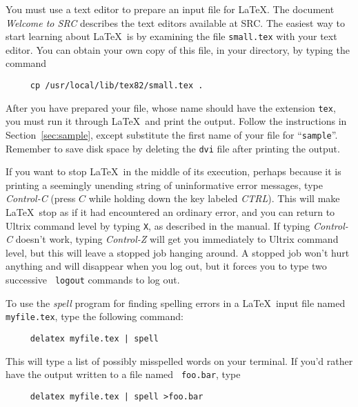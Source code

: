 You must use a text editor to prepare an input file for \LaTeX. The
document {\em Welcome to SRC\/} describes the text editors available
at SRC.  The easiest way to start learning about \LaTeX\ is by 
examining the file \mbox{\tt small.tex} with your text editor.
You can obtain your own copy of this file, in your directory,
by typing the command
\begin{verbatim}
     cp /usr/local/lib/tex82/small.tex .
\end{verbatim}
 
After you have prepared your file, whose name should have the extension
{\tt tex}, you must run it through \LaTeX\ and print the output.
Follow the instructions in Section~\ref{sec:sample}, except substitute
the first name of your file for ``\mbox{\tt sample}''.  Remember to
save disk space by deleting the {\tt dvi} file after printing the
output.
 
 
 
If you want to stop \LaTeX\ in the middle of its execution, perhaps
because it is printing a seemingly unending string of uninformative
error messages, type {\em Control-C\/} (press $C$ while holding down
the key labeled {\em CTRL\/}).  This will make \LaTeX\ stop as if it
had encountered an ordinary error, and you can return to Ultrix command
level by typing {\tt X}, as described in the manual.  If typing {\em
Control-C\/} doesn't work, typing {\em Control-Z\/} will get you
immediately to Ultrix command level, but this will leave a stopped job
hanging around.  A stopped job won't hurt anything and will disappear
when you log out, but it forces you to type two successive \mbox{\tt
logout} commands to log out.
 
To use the {\em spell\/} program for finding spelling errors in a
\LaTeX\ input file named \mbox{\tt myfile.tex}, type the following
command:
\begin{verbatim}
     delatex myfile.tex | spell
\end{verbatim}
This will type a list of possibly misspelled words on your terminal.
If you'd rather have the output written to a file named \mbox{\tt
foo.bar}, type
\begin{verbatim}
     delatex myfile.tex | spell >foo.bar
\end{verbatim}
 
